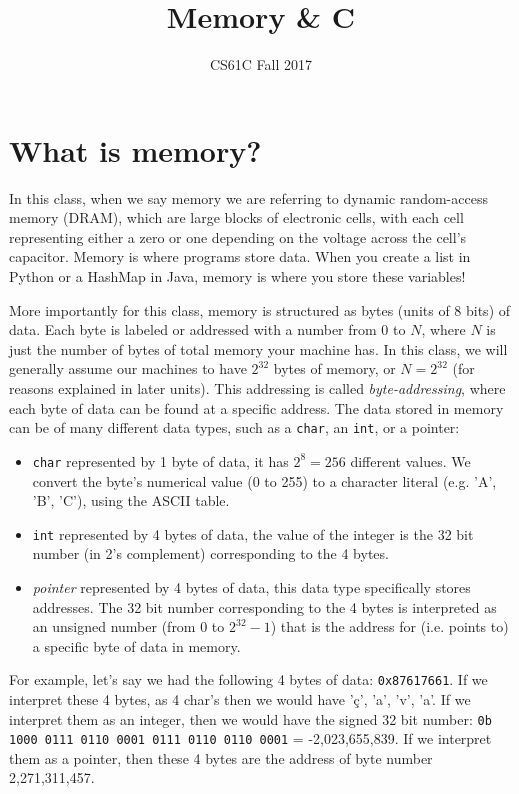 \documentclass{article}
\title{Memory \& C}
\author{CS61C Fall 2017}
\date{ }
\begin{document}
\maketitle
\tableofcontents


\section{What is memory?}

In this class, when we say memory we are referring to dynamic random-access memory (DRAM), which are large blocks of electronic cells, with each cell representing either a zero or one depending on the voltage across the cell's capacitor. Memory is where programs store data. When you create a list in Python or a HashMap in Java, memory is where you store these variables!

More importantly for this class, memory is structured as bytes (units of 8 bits) of data. Each byte is labeled or addressed with a number from 0 to $N$, where $N$ is just the number of bytes of total memory your machine has. In this class, we will generally assume our machines to have $2^{32}$ bytes of memory, or $N = 2^{32}$ (for reasons explained in later units).  This addressing is called \textit{byte-addressing}, where each byte of data can be found at a specific address. The data stored in memory can be of many different data types, such as a \texttt{char}, an \texttt{int}, or a pointer:
\begin{itemize} 
\item \texttt{char} represented by 1 byte of data, it has $2^8 = 256$ different values. We convert the byte's numerical value (0 to 255) to a character literal (e.g. 'A', 'B', 'C'), using the ASCII table.
\item \texttt{int} represented by 4 bytes of data, the value of the integer is the 32 bit number (in 2's complement) corresponding to the 4 bytes.  
\item \textit{pointer} represented by 4 bytes of data, this data type specifically stores addresses. The 32 bit number corresponding to the 4 bytes is interpreted as an unsigned number (from $0$ to $2^{32} - 1$) that is the address for (i.e. points to) a specific byte of data in memory. 
\end{itemize}

For example, let's say we had the following 4 bytes of data: \texttt{0x87617661}. If we interpret these 4 bytes, as 4 char's then we would have '\c{c}', 'a', 'v', 'a'. If we interpret them as an integer, then we would have the signed 32 bit number: \texttt{0b 1000 0111 0110 0001 0111 0110 0110 0001} = -2,023,655,839. If we interpret them as a pointer, then these 4 bytes are the address of byte number 2,271,311,457. 
\end{document}
